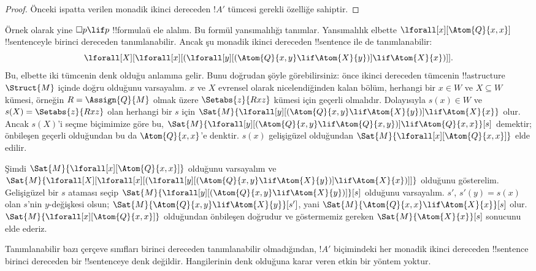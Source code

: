 \documentclass[../../../include/open-logic-section]{subfiles}
\begin{document}
\begin{proof}
  Önceki ispatta verilen monadik ikinci dereceden $!A'$ tümcesi gerekli
  özelliğe sahiptir.
\end{proof}

Örnek olarak yine $\Box p\lif p$ !!{formula}{}ü ele alalım. Bu formül
yansımalılığı tanımlar. Yansımalılık elbette $\lforall[x][\Atom{Q}{x,x}]$
!!{sentence}{}yle birinci dereceden tanımlanabilir. Ancak şu monadik ikinci
dereceden !!{sentence} ile de tanımlanabilir:
\[
\lforall[X][\lforall[x][(\lforall[y][(\Atom{Q}{x,y} \lif \Atom{X}{y})]
    \lif \Atom{X}{x})]].
\]
Bu, elbette iki tümcenin denk olduğu anlamına gelir. Bunu doğrudan şöyle
görebilirsiniz: önce ikinci dereceden tümcenin !!a{structure}
$\Struct{M}$ içinde doğru olduğunu varsayalım. $x$ ve $X$ evrensel olarak
nicelendiğinden kalan bölüm, herhangi bir $x\in W$ ve $X\subseteq W$ kümesi,
örneğin $R=\Assign{Q}{M}$ olmak üzere $\Setabs{z}{Rxz}$ kümesi için geçerli
olmalıdır. Dolayısıyla $s(x)\in W$ ve $s(X)=\Setabs{z}{Rxz}$ olan herhangi
bir $s$ için $\Sat{M}{\lforall[y][(\Atom{Q}{x,y}\lif
    \Atom{X}{y})]\lif\Atom{X}{x}}$ olur. Ancak $s(X)$'i seçme biçimimize
göre bu, $\Sat{M}{\lforall[y][(\Atom{Q}{x,y}\lif
    \Atom{Q}{x,y})]\lif\Atom{Q}{x,x}}[s]$ demektir; önbileşen geçerli
olduğundan bu da $\Atom{Q}{x,x}$'e denktir. $s(x)$ gelişigüzel olduğundan
$\Sat{M}{\lforall[x][\Atom{Q}{x,x}]}$ elde edilir.

Şimdi $\Sat{M}{\lforall[x][\Atom{Q}{x,x}]}$ olduğunu varsayalım ve
$\Sat{M}{\lforall[X][\lforall[x][(\lforall[y][(\Atom{Q}{x,y} \lif
        \Atom{X}{y})] \lif \Atom{X}{x})]]}$ olduğunu gösterelim.
Gelişigüzel bir $s$ ataması seçip
$\Sat{M}{\lforall[y][(\Atom{Q}{x,y}\lif\Atom{X}{y})]}[s]$ olduğunu
varsayalım. $s'$, $s'(y)=s(x)$ olan $s$'nin $y$-değişkesi olsun;
$\Sat{M}{\Atom{Q}{x,y}\lif\Atom{X}{y}}[s']$, yani
$\Sat{M}{\Atom{Q}{x,x}\lif\Atom{X}{x}}[s]$ olur.
$\Sat{M}{\lforall[x][\Atom{Q}{x,x}]}$ olduğundan önbileşen doğrudur ve
göstermemiz gereken $\Sat{M}{\Atom{X}{x}}[s]$ sonucunu elde ederiz.

Tanımlanabilir bazı çerçeve sınıfları birinci dereceden tanımlanabilir
olmadığından, $!A'$ biçimindeki her monadik ikinci dereceden !!{sentence}
birinci dereceden bir !!{sentence}{}ye denk değildir. Hangilerinin denk olduğuna
karar veren etkin bir yöntem yoktur.
\end{document}
